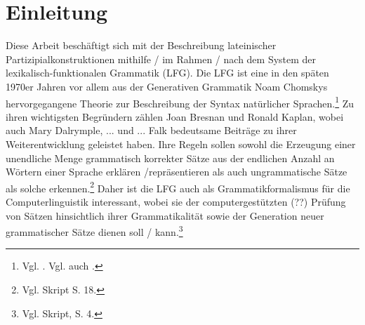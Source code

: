\documentclass[12pt,a4paper]{article}
\begin{document}

\setcounter{page}{2}
\begingroup
\flushbottom
\tableofcontents
\thispagestyle{empty}
\pagebreak
\endgroup

\nocite{Menge}
\nocite{LHS}
\nocite{KSt}
\nocite{Rohrer}
\nocite{Skript}
\nocite{Dal}
\nocite{Falk}
\nocite{Bresnan}
\nocite{Snijders}



\section{Einleitung}
Diese Arbeit beschäftigt sich mit der Beschreibung lateinischer Partizipialkonstruktionen mithilfe / im Rahmen / nach dem System der lexikalisch-funktionalen Grammatik (LFG). Die LFG ist eine in den späten 1970er Jahren vor allem aus der Generativen Grammatik Noam Chomskys hervorgegangene Theorie zur Beschreibung der Syntax natürlicher Sprachen.\footnote{Vgl. \cite[4]{Skript}. Vgl. auch \cite[1]{Dal}.} Zu ihren wichtigsten Begründern zählen Joan Bresnan und Ronald Kaplan, wobei auch Mary Dalrymple, ... und ... Falk bedeutsame Beiträge zu ihrer Weiterentwicklung geleistet haben.
Ihre Regeln sollen sowohl die Erzeugung einer unendliche Menge grammatisch korrekter Sätze aus der endlichen Anzahl an Wörtern einer Sprache erklären /repräsentieren als auch ungrammatische Sätze als solche erkennen.\footnote{Vgl. Skript S. 18.} Daher ist die LFG auch als Grammatikformalismus für die Computerlinguistik interessant, wobei sie der computergestützten (??) Prüfung von Sätzen hinsichtlich ihrer Grammatikalität sowie der Generation neuer grammatischer Sätze dienen soll / kann.\footnote{Vgl. Skript, S. 4.}
\end{document}
